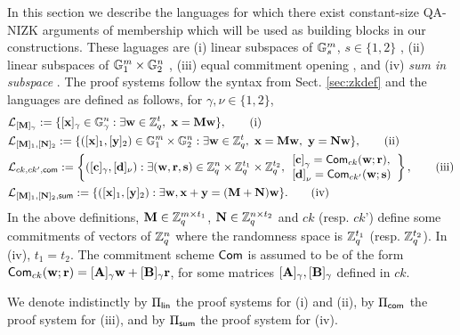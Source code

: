 In this section we describe the languages for which there exist constant-size QA-NIZK arguments of membership which will be used as building blocks in our constructions.  These laguages are (i) linear subspaces of $\mathbb{G}_s^m$, $s \in \{1,2\}$ \cite{C:JutRoy14,EC:KilWee15,EC:LPJY14}, (ii) linear subspaces of $\mathbb{G}_1^m\times\mathbb{G}_2^n$ \cite{AC:GonHevRaf15}, (iii) equal commitment opening \cite{AC:GonHevRaf15}, and (iv) \emph{sum in subspace} \cite{AC:GonHevRaf15}. The proof systems follow the syntax from Sect. \ref{sec:zkdef} and the languages are defined as follows, for $\gamma,\nu \in \{1,2\}$, 
\begin{align}
&\mathcal{L}_{[\mathbf{{M}}]_\gamma}:=\{ [\mathbf{x}]_{\gamma} \in \mathbb{G}_{\gamma}^{n}:  \exists \mathbf{w} \in \mathbb{Z}_q^{t}, \  \mathbf{x}=\mathbf{{M}}\mathbf{w} \}, \tag{i}\\
&\mathcal{L}_{[\mathbf{{M}}]_1,[\mathbf{{N}}]_2}:=\{ ([\mathbf{x}]_1,[\mathbf{y}]_2) \in \mathbb{G}_1^{m}\times\mathbb{G}_2^n:  \exists \mathbf{w} \in \mathbb{Z}_q^{t}, \  \mathbf{x}=\mathbf{{M}}\mathbf{w}, \   \mathbf{y}=\mathbf{{N}}\mathbf{w} \}, \tag{ii}\\
&\mathcal{L}_{ck,ck',\mathsf{com}}:=\left\{([\mathbf{c}]_\gamma,[\mathbf{d}]_\nu):\exists (\mathbf{w}, \mathbf{r},\mathbf{s}) 
\in \mathbb{Z}_q^n \times \mathbb{Z}_q^{t_1} \times \mathbb{Z}_q^{t_2},  
\begin{array}{l}
    {[\mathbf{c}]}_\gamma=\mathsf{Com}_{ck}(\mathbf{w};\mathbf{r}),\\
    {[\mathbf{d}]}_\nu=\mathsf{Com}_{ck'}(\mathbf{w};\mathbf{s})
\end{array}
\right\}, \tag{iii}\\
&\mathcal{L}_{[\mathbf{{M}}]_1,[\mathbf{{N}}]_2,\mathsf{sum}}:=\{([\mathbf{x}]_1,[\mathbf{y}]_2):\exists\mathbf{w}, \mathbf{x}+\mathbf{y}=(\mathbf{{M}}+\mathbf{{N}})\mathbf{w}\}. \tag{iv}
\end{align}
In the above definitions, $\mathbf{{M}} \in \mathbb{Z}_q^{m \times t_1}$,
  $\mathbf{{N}} \in \mathbb{Z}_q^{n \times t_2}$ and $ck$ (resp. $ck$') define some commitments of vectors of $\mathbb{Z}_q^{n}$ where the randomness space is $\mathbb{Z}_q^{t_1}$ (resp. $\mathbb{Z}_q^{t_2}$). In (iv), $t_1=t_2$. The commitment scheme $\mathsf{Com}$ is assumed to be of the form 
 $\mathsf{Com}_{ck}(\mathbf{w};\mathbf{r})=[\mathbf{{A}}]_\gamma \mathbf{w}+[\mathbf{{B}}]_\gamma \mathbf{r}$, 
 for some matrices $[\mathbf{{A}}]_\gamma,[\mathbf{{B}}]_\gamma$ defined in 
  $ck$. 

We denote indistinctly by $\Pi_{\mathsf{lin}}$ the proof systems for (i) and (ii), by $\Pi_{\mathsf{com}}$ the proof system for (iii), and by $\Pi_{\mathsf{sum}}$ the proof system for (iv).

